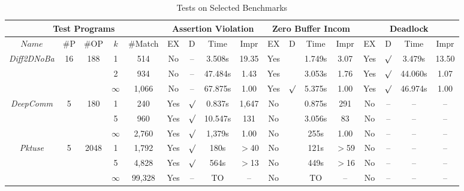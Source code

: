 \begin{savenotes}
\begin{table*}[t]
\begin{center}
\scriptsize
\caption{Tests on Selected Benchmarks}\label{table:benchmarks}
     \begin{threeparttable}
\begin{tabular}{|c|c|c|c|c|c|c|c|c|c|c|c|c|c|c|c|c|}
		\hline
         \multicolumn{5}{|c|}{Test Programs} & \multicolumn{4}{c|}{Assertion Violation} & \multicolumn{4}{c|}{Zero Buffer Incom\tnote{\textdagger}} & \multicolumn{4}{c|}{Deadlock}  \\ \hline
          $Name$ & \#P & \#OP &$k$& \#Match & EX & D & Time& Impr &EX&D & Time & Impr& EX &D & Time &Impr\\ \hline
          \multirow{3}{*}{\textit{Diff2DNoBa}} & \multirow{3}{*}{16}& \multirow{3}{*}{188} & 1 & 514 & No & -- &3.508s & 19.35 & Yes &  &1.749s&3.07 & Yes&$\surd$ & 3.479s& 13.50 \\ \cline{4-17}
								&				&                               & 2 & 934 & No & -- & 47.484s & 1.43 & Yes & & 3.053s& 1.76 &Yes& $\surd$& 44.060s&1.07\\ \cline{4-17}
								&				&                               & $\infty$& 1,066 & No& -- & 67.875s& 1.00 & Yes & $\surd$ &5.375s&1.00&Yes & $\surd$& 46.974s &1.00\\ \hline
								\hline
	
	 \multirow{3}{*}{\textit{DeepComm}} & \multirow{3}{*}{5}& \multirow{3}{*}{180} & 1 & 240 & Yes & $\surd$& 0.837s & 1,647& No &  & 0.875s & 291 & No & -- & --\tnote{s} & --\\ \cline{4-17}
								&				&                            & 5 & 960 & Yes & $\surd$& 10.547s & 131 & No &  & 3.056s & 83 & No& --& --\tnote{s}& --\\ \cline{4-17}
								&				& 			     & $\infty$ & 2,760 & Yes & $\surd$ & 1,379s & 1.00 & No &  & 255s  & 1.00 &No& --& --\tnote{s}& --\\ \hline
								\hline
								
	 \multirow{3}{*}{\textit{Pktuse}} & \multirow{3}{*}{5}& \multirow{3}{*}{2048} & 1 & 1,792 &Yes & $\surd$ & 180s & $>$40 & No &  & 121s & $>$59 & No&--&--\tnote{s}&--\\ \cline{4-17}
								&				& 		       &  5   &    4,828      & Yes& $\surd$ & 564s & $>$13& No &  & 449s & $>$16 &No&--&--\tnote{s}&--\\ \cline{4-17}
								&				& 		       &  $\infty$ & 99,328&Yes & -- & TO & --& No & &  TO & --&No&--&--\tnote{s}&--\\ \hline
								\hline
								

\end{tabular}
\end{threeparttable}
\end{center}
\end{table*}
\end{savenotes}
